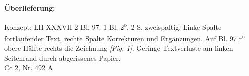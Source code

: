       
               
                \begin{ledgroupsized}[r]{120mm}
                \footnotesize 
                \pstart                
                \noindent\textbf{\"{U}berlieferung:}   
                \pend
                \end{ledgroupsized}
            
              
                            \begin{ledgroupsized}[r]{114mm}
                            \footnotesize 
                            \pstart \parindent -6mm
                            Konzept: LH XXXVII 2 Bl. 97. 1 Bl. 2\textsuperscript{o}. 2 S. zweispaltig. Linke Spalte fort\-laufender Text, rechte Spalte Korrekturen und Erg\"{a}nzungen. Auf Bl. 97 r\textsuperscript{o} obere H\"{a}lfte rechts die Zeichnung \textit{[Fig. 1]}. Geringe Textverluste am linken Seitenrand durch abgerissenes Papier.\\Cc 2, Nr. 492 A \pend
                            \end{ledgroupsized}
                \vspace*{8mm}
                \pstart 
                \normalsize
